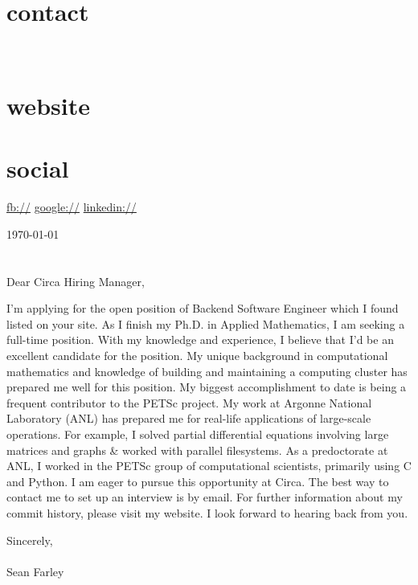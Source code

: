 \documentclass[]{fancy-cv}
\begin{document}

\begin{aside}
  \section{contact}
    \href{mailto:\myemail}{\myemail}
    ~
    \myphone
    ~
    \myaddress
    \mycity
  \section{website}
    \href{\mywebsite}{\mywebsite}
  \section{social}
    \href{http://facebook.com/\myfb}{fb://\myfb}
    \href{http://plug.google.com/\mygp}{google://\mygp}
    \href{http://www.linkedin.com/in/\mylinkedin}{linkedin://\mylinkedin}
\end{aside}

\vspace{.8em}
\large
\today\\
\\
\\
Dear Circa Hiring Manager,

I'm applying for the open position of Backend Software Engineer which I found
listed on your site. As I finish my Ph.D. in Applied Mathematics, I am seeking
a full-time position. With my knowledge and experience, I believe that I’d be
an excellent candidate for the position.
%
\newline\newline
%
My unique background in computational mathematics and knowledge of building and
maintaining a computing cluster has prepared me well for this position. My
biggest accomplishment to date is being a frequent contributor to the PETSc
project.
%
\newline\newline
%
My work at Argonne National Laboratory (ANL) has prepared me for real-life
applications of large-scale operations. For example, I solved partial
differential equations involving large matrices and graphs \& worked with
parallel filesystems. As a predoctorate at ANL, I worked in the PETSc group of
computational scientists, primarily using C and Python.
%
\newline\newline
%
I am eager to pursue this opportunity at Circa. The best way to contact me to
set up an interview is by email. For further information about my commit
history, please visit my website. I look forward to hearing back from you.

\vspace{2em}
Sincerely,\\
\\
Sean Farley
\end{document}
